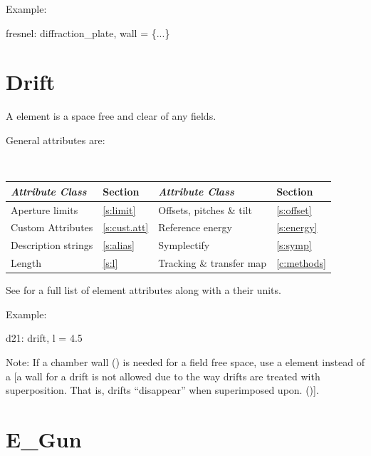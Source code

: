 Example:
\begin{example}
  fresnel: diffraction_plate, wall = \{...\}
\end{example}

\section{Drift}
\label{s:drift}

A  element is a space free and clear of any fields.

General  attributes are:
\begin{center}
\tt
\begin{tabular}{llll} \toprule
  {\sl Attribute Class}      & Section          & {\sl Attribute Class}      & Section         \\ \midrule
  Aperture limits            & \ref{s:limit}    & Offsets, pitches \& tilt   & \ref{s:offset}  \\
  Custom Attributes          & \ref{s:cust.att} & Reference energy           & \ref{s:energy}  \\ 
  Description strings        & \ref{s:alias}    & Symplectify                & \ref{s:symp}    \\ 
  Length                     & \ref{s:l}        & Tracking \& transfer map   & \ref{c:methods} \\ 
  \bottomrule
\end{tabular}
\end{center}
\toffset
See  for a full list of element attributes along with a their units.

Example:
\begin{example}
  d21: drift, l = 4.5
\end{example}

Note: If a chamber wall () is needed for a field free
space, use a  element instead of a  [a wall for a
drift is not allowed due to the way drifts are treated with
superposition. That is, drifts ``disappear'' when superimposed
upon. ()].

\section{E_Gun}
\label{s:e.gun}

